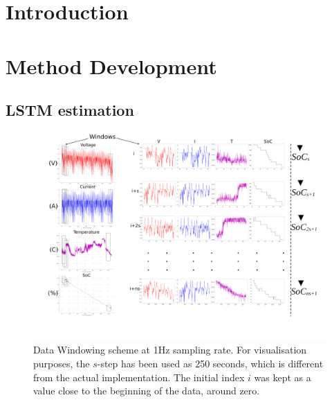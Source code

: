 \documentclass[journal]{IEEEtranTIE}
\begin{document}
%
{}


\section{Introduction} \label{sec:Introduction}

\section{Method Development} \label{sec:layer}
\subsection{LSTM estimation}

\begin{landscape}
  \begin{figure}[ht]
      \centering
      \includegraphics[width=\linewidth]{II_Body/images/Windowing4f-A3.jpg}
      \caption{Data Windowing scheme at 1Hz sampling rate. For visualisation purposes, the $s$-step has been used as 250 seconds, which is different from the actual implementation. The initial index $i$ was kept as a value close to the beginning of the data, around zero.}
      \label{fig:Windowing}
  \end{figure}
\end{landscape}
\end{document}
